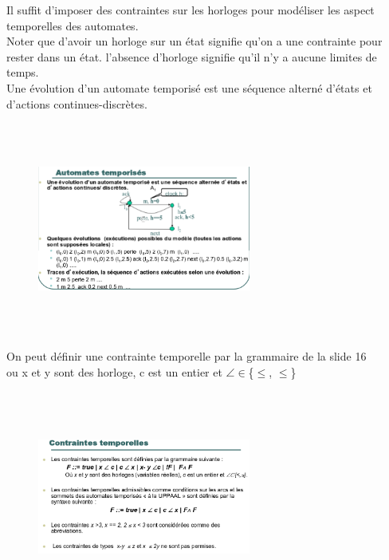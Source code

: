 \documentclass[oneside]{book}
\begin{document}
    Il suffit d'imposer des contraintes sur les horloges pour modéliser les aspect temporelles des automates.\\
    
    Noter que d'avoir un horloge sur un état signifie qu'on a une contrainte pour rester dans un état. l'absence d'horloge signifie qu'il n'y a aucune limites de temps.\\
    
    Une évolution d'un automate temporisé est une séquence alterné d'états et d'actions continues-discrètes.\\
    
    \begin{figure}[!ht]
    	\centering
    	\includegraphics[width = 7cm, height = 7cm, keepaspectratio]{Images/slide15.png}
    	\label{fig:slide15}
    \end{figure}
    
    On peut définir une contrainte temporelle par la grammaire de la slide 16\\
    
    ou x et y sont des horloge, c est un entier et $\angle$$\in$\{$\le$, $\leq$\}\\
    \begin{figure}[!ht]
    	\centering
    	\includegraphics[width = 7cm, height = 7cm, keepaspectratio]{Images/slide16.png}
    	\label{fig:slide16}
    \end{figure}
    
\end{document}
